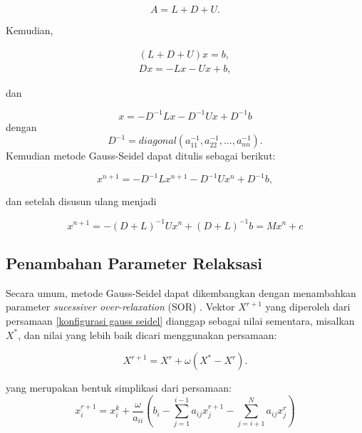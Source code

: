 \begin{equation}
    A = L + D + U.
\end{equation}

Kemudian,

\begin{equation}
    \begin{split}
        (L+D+U)x=b,\\
        Dx=-Lx-Ux+b,
    \end{split}
\end{equation}

dan

\begin{equation}
    x = -D^{-1}Lx - D^{-1} Ux+D^{-1}b
\end{equation}
dengan
\begin{equation}
    D^{-1} = diagonal(a_{11}^{-1}, a_{22}^{-1},...,a_{nn}^{-1}).
\end{equation}
Kemudian metode Gauss-Seidel dapat ditulis sebagai berikut:

\begin{equation}
    x^{n+1} = -D^{-1}Lx^{n+1}-D^{-1}Ux^n+D^{-1}b,
\end{equation}

dan setelah disusun ulang menjadi

\begin{equation}
    x^{n+1} = -(D+L)^{-1}Ux^{n}+(D+L)^{-1}b = Mx^n+c
\end{equation}

\subsection{Penambahan Parameter Relaksasi}
Secara umum, metode Gauss-Seidel dapat dikembangkan dengan menambahkan parameter \emph{sucessiver over-relaxation} (SOR) \citep{Bottoni2022}. Vektor $X^{r+1}$ yang diperoleh dari persamaan \eqref{konfigurasi gauss seidel} dianggap sebagai nilai sementara, misalkan $X^*$, dan nilai yang lebih baik dicari menggunakan persamaan:

\begin{equation}\label{gauss seidel with provisional value}
    X^{r+1} = X^r + \omega(X^* - X^r).
\end{equation}

yang merupakan bentuk simplikasi dari persamaan:
\begin{equation}\label{metode relaksasi}
    x_i^{r+1} = x_i^k+\frac{\omega}{a_{ii}} \left(b_i-\sum_{j=1}^{i-1}a_{ij}x_j^{r+1} - \sum_{j=i+1}^N a_{ij}x_j^r \right)
\end{equation}

